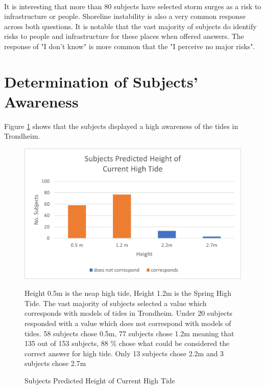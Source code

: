 \paragraph{}
It is interesting that more than 80 subjects have selected storm surges as a risk to infrastructure or people. Shoreline instability is also a very common response across both questions. It is notable that the vast majority of subjects do identify risks to people and infrastructure for these places when offered answers. The response of "I don't know" is more common that the "I perceive no major risks". 


\section{Determination of Subjects' Awareness}
Figure \ref{fig:high_tide_answer} shows that the subjects displayed a high awareness of the tides in Trondheim. 

\begin{figure}[H]
    \centering
    \includegraphics{fig_results/2022-hightide-answers.png}
    \caption{Subjects Predicted Height of Current High Tide}{ Height 0.5m is the neap high tide, Height 1.2m is the Spring High Tide. The vast majority of subjects selected a value which corresponds with models of tides in Trondheim. Under 20 subjects responded with a value which does not correspond with models of tides. 58 subjects chose 0.5m, 77 subjects chose 1.2m meaning that 135 out of 153 subjects, 88 \% chose what could be considered the correct answer for high tide. Only 13 subjects chose 2.2m and 3 subjects chose 2.7m}
    \label{fig:high_tide_answer}
\end{figure}
\paragraph{}


